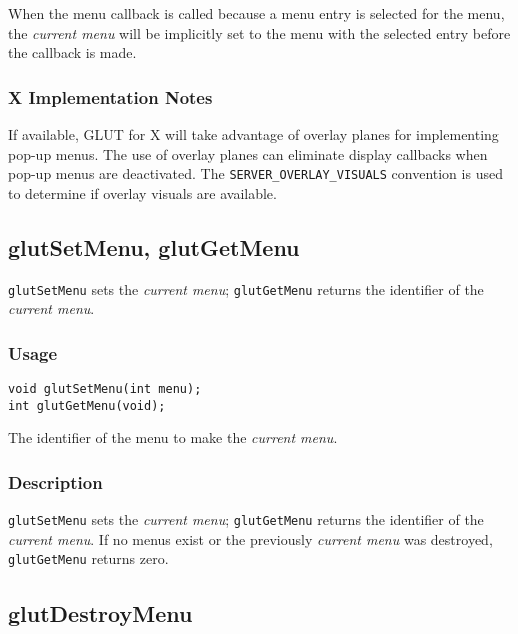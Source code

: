 When the menu callback is called because a menu entry is selected for
the menu, the {\em current menu} will be implicitly set to the menu
with the selected entry before the callback is made.

\subsubsection*{X Implementation Notes}

If available, GLUT for X will take advantage of overlay planes
for implementing pop-up menus.  The use of overlay planes can
eliminate display callbacks when pop-up menus are deactivated.
The {\tt SERVER\_OVERLAY\_VISUALS} convention \cite{kilgard93} is used to
determine if overlay visuals are available.

\subsection{glutSetMenu, glutGetMenu}

{\tt glutSetMenu} sets the {\em current menu}; {\tt glutGetMenu} returns the
identifier of the {\em current menu}.

\subsubsection*{Usage}

\begin{verbatim}
void glutSetMenu(int menu);
int glutGetMenu(void);
\end{verbatim}
\begin{description}
\itemsep 0in
\item[\tt menu]
The identifier of the menu to make the {\em current menu}.
\end{description}

\subsubsection*{Description}

{\tt glutSetMenu} sets the {\em current menu}; {\tt glutGetMenu} returns the
identifier of the {\em current menu}.
If no menus exist or the previously {\em current menu} was destroyed,
{\tt glutGetMenu} returns zero.

\subsection{glutDestroyMenu}

